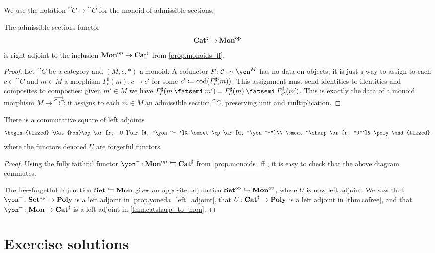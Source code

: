\documentclass[Book-Poly]{subfiles}
\begin{document}
We use the notation $\cat{C}\mapsto\vec{\cat{C}}$ for the monoid of admissible sections.

\begin{theorem}\label{thm.catsharp_to_mon}
The admissible sections functor
\[\mathbf{Cat}^\sharp\to\mathbf{Mon}^{\textnormal{op}}\]
is right adjoint to the inclusion $\mathbf{Mon}^{\textnormal{op}}\to\mathbf{Cat}^\sharp$ from \cref{prop.monoids_ff}.
\end{theorem}
\begin{proof}
Let $\cat{C}$ be a category and $(M,e,*)$ a monoid. A cofunctor $F\colon\cat{C}\cof\yon^M$ has no data on objects; it is just a way to assign to each $c\in \cat{C}$ and $m\in M$ a morphism $F^\sharp_c(m)\colon c\to c'$ for some $c'\coloneqq\operatorname{cod}(F^\sharp_c(m))$. This assignment must send identities to identities and composites to composites: given $m'\in M$ we have $F^\sharp_c(m\then m')=F^\sharp_c(m)\then F^\sharp_{c'}(m')$. This is exactly the data of a monoid morphism $M\to \vec{\cat{C}}$: it assigns to each $m\in M$ an admissible section $\cat{C}$, preserving unit and multiplication.
\end{proof}

\begin{proposition}\label{prop.traj_mon_poly}
There is a commutative square of left adjoints
\[
\begin{tikzcd}
	\Cat{Mon}\op\ar[r, "U"]\ar[d, "\yon^-"']&
	\smset\op\ar[d, "\yon^-"]\\
	\smcat^\sharp\ar[r, "U"']&
	\poly
\end{tikzcd}
\]
where the functors denoted $U$ are forgetful functors.
\end{proposition}
\begin{proof}
Using the fully faithful functor $\yon^-\colon\Cat{Mon}\op\fromto\smcat^\sharp$ from \cref{prop.monoids_ff}, it is easy to check that the above diagram commutes. 

The free-forgetful adjunction $\mathbf{Set}\leftrightarrows\mathbf{Mon}$ gives an opposite adjunction $\mathbf{Set}^{\textnormal{op}}\leftrightarrows\mathbf{Mon}^{\textnormal{op}}$, where $U$ is now left adjoint. We saw that $\yon^-\colon\smset\op\to\poly$ is a left adjoint in \cref{prop.yoneda_left_adjoint}, that $U\colon\mathbf{Cat}^\sharp\to\mathbf{Poly}$ is a left adjoint in \cref{thm.cofree}, and that $\yon^-\colon\Cat{Mon}\to\smcat^\sharp$ is a left adjoint in \cref{thm.catsharp_to_mon}.
\end{proof}

\section{Exercise solutions}
{\footnotesize
}
\end{document}
